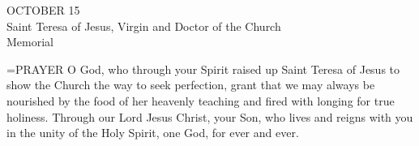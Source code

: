 \begin{center}\normalsize OCTOBER 15\\
\footnotesize Saint Teresa of Jesus, Virgin and Doctor of the Church\\
\footnotesize Memorial\\
\end{center}

\hangindent=\parindent \small{PRAYER 
O God, who through your Spirit
raised up Saint Teresa of Jesus
to show the Church the way to seek perfection,
grant that we may always be nourished
by the food of her heavenly teaching
and fired with longing for true holiness.
Through our Lord Jesus Christ, your Son,
who lives and reigns with you in the unity of the Holy Spirit,
one God, for ever and ever.\\}
 
